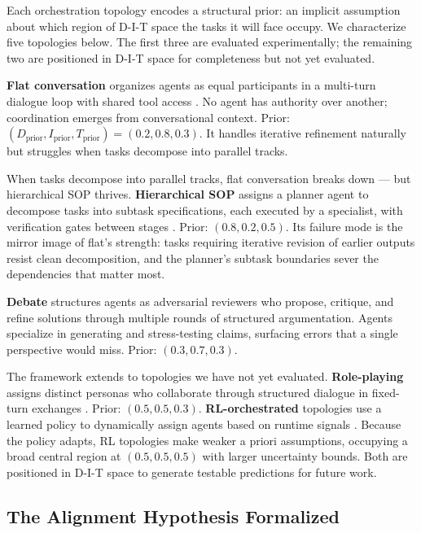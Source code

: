 Each orchestration topology encodes a structural prior: an implicit assumption about which region of D-I-T space the tasks it will face occupy. We characterize five topologies below. The first three are evaluated experimentally; the remaining two are positioned in D-I-T space for completeness but not yet evaluated.

\textbf{Flat conversation} organizes agents as equal participants in a multi-turn dialogue loop with shared tool access \cite{wu_2023}. No agent has authority over another; coordination emerges from conversational context. Prior: $(D_{\text{prior}}, I_{\text{prior}}, T_{\text{prior}}) = (0.2, 0.8, 0.3)$. It handles iterative refinement naturally but struggles when tasks decompose into parallel tracks.

When tasks decompose into parallel tracks, flat conversation breaks down --- but hierarchical SOP thrives. \textbf{Hierarchical SOP} assigns a planner agent to decompose tasks into subtask specifications, each executed by a specialist, with verification gates between stages \cite{hong_2023}. Prior: $(0.8, 0.2, 0.5)$. Its failure mode is the mirror image of flat's strength: tasks requiring iterative revision of earlier outputs resist clean decomposition, and the planner's subtask boundaries sever the dependencies that matter most.

\textbf{Debate} structures agents as adversarial reviewers who propose, critique, and refine solutions through multiple rounds of structured argumentation. Agents specialize in generating and stress-testing claims, surfacing errors that a single perspective would miss. Prior: $(0.3, 0.7, 0.3)$.

The framework extends to topologies we have not yet evaluated. \textbf{Role-playing} assigns distinct personas who collaborate through structured dialogue in fixed-turn exchanges \cite{li_2023}. Prior: $(0.5, 0.5, 0.3)$. \textbf{RL-orchestrated} topologies use a learned policy to dynamically assign agents based on runtime signals \cite{evolving_2025}. Because the policy adapts, RL topologies make weaker a priori assumptions, occupying a broad central region at $(0.5, 0.5, 0.5)$ with larger uncertainty bounds. Both are positioned in D-I-T space to generate testable predictions for future work.

\subsection{The Alignment Hypothesis Formalized}\label{the-alignment-hypothesis-formalized}

